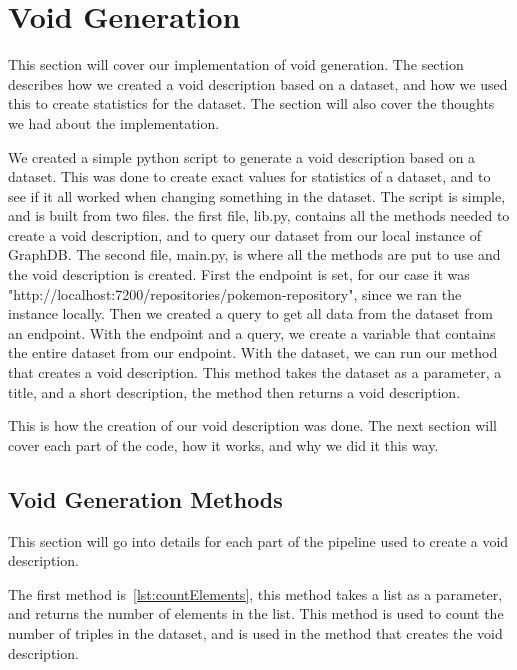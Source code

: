 \section{Void Generation}\label{sec:void}

This section will cover our implementation of void generation. The section describes how we created a void description based on a dataset, and how we used this to create statistics for the dataset. The section will also cover the thoughts we had about the implementation.

We created a simple python script to generate a void description based on a dataset. This was done to create exact values for statistics of a dataset, and to see if it all worked when changing something in the dataset. The script is simple, and is built from two files. the first file, lib.py, contains all the methods needed to create a void description, and to query our dataset from our local instance of GraphDB. The second file, main.py, is where all the methods are put to use and the void description is created. First the endpoint is set, for our case it was "http://localhost:7200/repositories/pokemon-repository", since we ran the instance locally. Then we created a query to get all data from the dataset from an endpoint. With the endpoint and a query, we create a variable that contains the entire dataset from our endpoint. With the dataset, we can run our method that creates a void description. This method takes the dataset as a parameter, a title, and a short description, the method then returns a void description.

This is how the creation of our \gls{void} description was done. The next section will cover each part of the code, how it works, and why we did it this way.

\subsection{Void Generation Methods}\label{sec:voidmethods}
This section will go into details for each part of the pipeline used to create a void description.

The first method is~\ref{lst:countElements}, this method takes a list as a parameter, and returns the number of elements in the list. This method is used to count the number of triples in the dataset, and is used in the method that creates the void description.

